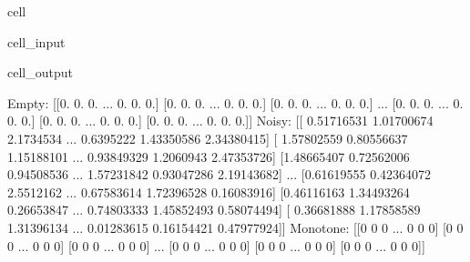 \documentclass[letterpaper,10pt,english]{jupyterBook}
\begin{document}
\begin{sphinxuseclass}{cell}\begin{sphinxVerbatimInput}

\begin{sphinxuseclass}{cell_input}
\begin{sphinxVerbatim}[commandchars=\\\{\}]
\end{sphinxVerbatim}

\end{sphinxuseclass}\end{sphinxVerbatimInput}
\begin{sphinxVerbatimOutput}

\begin{sphinxuseclass}{cell_output}
\begin{sphinxVerbatim}[commandchars=\\\{\}]
Empty:
 [[0. 0. 0. ... 0. 0. 0.]
 [0. 0. 0. ... 0. 0. 0.]
 [0. 0. 0. ... 0. 0. 0.]
 ...
 [0. 0. 0. ... 0. 0. 0.]
 [0. 0. 0. ... 0. 0. 0.]
 [0. 0. 0. ... 0. 0. 0.]]
Noisy:
 [[ 0.51716531 \PYGZhy{}1.01700674  2.1734534  ...  0.6395222  \PYGZhy{}1.43350586
   2.34380415]
 [ 1.57802559 \PYGZhy{}0.80556637 \PYGZhy{}1.15188101 ...  0.93849329  1.2060943
  \PYGZhy{}2.47353726]
 [\PYGZhy{}1.48665407  0.72562006 \PYGZhy{}0.94508536 ...  1.57231842 \PYGZhy{}0.93047286
   2.19143682]
 ...
 [\PYGZhy{}0.61619555 \PYGZhy{}0.42364072  2.5512162  ...  0.67583614 \PYGZhy{}1.72396528
   0.16083916]
 [\PYGZhy{}0.46116163 \PYGZhy{}1.34493264  0.26653847 ...  0.74803333  1.45852493
  \PYGZhy{}0.58074494]
 [ 0.36681888  1.17858589 \PYGZhy{}1.31396134 ... \PYGZhy{}0.01283615 \PYGZhy{}0.16154421
   0.47977924]]
Monotone:
 [[0 0 0 ... 0 0 0]
 [0 0 0 ... 0 0 0]
 [0 0 0 ... 0 0 0]
 ...
 [0 0 0 ... 0 0 0]
 [0 0 0 ... 0 0 0]
 [0 0 0 ... 0 0 0]]
\end{sphinxVerbatim}

\end{sphinxuseclass}\end{sphinxVerbatimOutput}

\end{sphinxuseclass}
\sphinxstepscope
\end{document}
